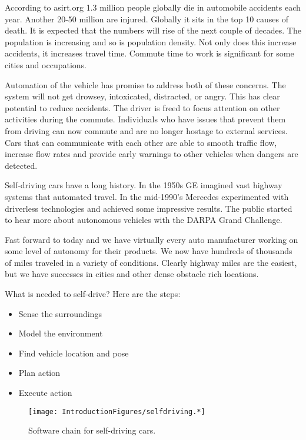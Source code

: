 According to {asirt.org} 1.3 million people globally die in automobile
accidents each year. Another 20-50 million are injured. Globally it sits
in the top 10 causes of death. It is expected that the numbers will rise
of the next couple of decades. The population is increasing and so is
population density. Not only does this increase accidents, it increases
travel time. Commute time to work is significant for some cities and
occupations.

Automation of the vehicle has promise to address both of these concerns.
The system will not get drowsey, intoxicated, distracted, or angry. This
has clear potential to reduce accidents. The driver is freed to focus
attention on other activities during the commute. Individuals who have
issues that prevent them from driving can now commute and are no longer
hostage to external services. Cars that can communicate with each other
are able to smooth traffic flow, increase flow rates and provide early
warnings to other vehicles when dangers are detected.

Self-driving cars have a long history. In the 1950s GE imagined vast
highway systems that automated travel. In the mid-1990's Mercedes
experimented with driverless technologies and achieved some impressive
results. The public started to hear more about autonomous vehicles with
the DARPA Grand Challenge.

Fast forward to today and we have virtually every auto manufacturer
working on some level of autonomy for their products. We now have
hundreds of thousands of miles traveled in a variety of conditions.
Clearly highway miles are the easiest, but we have successes in cities
and other dense obstacle rich locations.

What is needed to self-drive? Here are the steps:

\begin{itemize}
\tightlist
\item
  Sense the surroundings
\item
  Model the environment
\item
  Find vehicle location and pose
\item
  Plan action
\item
  Execute action
\end{itemize}

\begin{figure}
\centering
\texttt{[image: IntroductionFigures/selfdriving.*]}
\caption{Software chain for self-driving cars.}
\end{figure}

